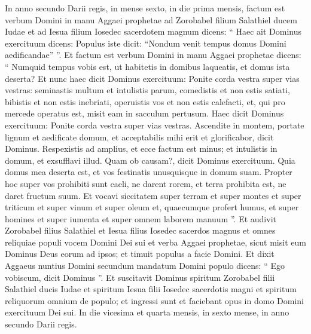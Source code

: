 \begin{biblechapter}
 \verse In anno secundo Darii regis, in mense sexto, in die prima mensis, factum est verbum Domini in manu Aggaei prophetae ad Zorobabel filium Salathiel ducem Iudae et ad Iesua filium Iosedec sacerdotem magnum dicens: 
\verse “ Haec ait Dominus exercituum dicens: Populus iste dicit: “Nondum venit tempus domus Domini aedificandae” ”. 
\verse Et factum est verbum Domini in manu Aggaei prophetae dicens: 
\verse “ Numquid tempus vobis est, ut habitetis in domibus laqueatis, et domus ista deserta? 
\verse Et nunc haec dicit Dominus exercituum: Ponite corda vestra super vias vestras: 
\verse seminastis multum et intulistis parum, comedistis et non estis satiati, bibistis et non estis inebriati, operuistis vos et non estis calefacti, et, qui pro mercede operatus est, misit eam in sacculum pertusum. 
\verse Haec dicit Dominus exercituum: Ponite corda vestra super vias vestras. 
\verse Ascendite in montem, portate lignum et aedificate domum, et acceptabilis mihi erit et glorificabor, dicit Dominus. 
 \verse Respexistis ad amplius, et ecce factum est minus; et intulistis in domum, et exsufflavi illud. Quam ob causam?, dicit Dominus exercituum. Quia domus mea deserta est, et vos festinatis unusquisque in domum suam. 
\verse Propter hoc super vos prohibiti sunt caeli, ne darent rorem, et terra prohibita est, ne daret fructum suum. 
\verse Et vocavi siccitatem super terram et super montes et super triticum et super vinum et super oleum et, quaecumque profert humus, et super homines et super iumenta et super omnem laborem manuum ”.
 \verse Et audivit Zorobabel filius Salathiel et Iesua filius Iosedec sacerdos magnus et omnes reliquiae populi vocem Domini Dei sui et verba Aggaei prophetae, sicut misit eum Dominus Deus eorum ad ipsos; et timuit populus a facie Domini.
 \verse Et dixit Aggaeus nuntius Domini secundum mandatum Domini populo dicens: “ Ego vobiscum, dicit Dominus ”. 
\verse Et suscitavit Dominus spiritum Zorobabel filii Salathiel ducis Iudae et spiritum Iesua filii Iosedec sacerdotis magni et spiritum reliquorum omnium de populo; et ingressi sunt et faciebant opus in domo Domini exercituum Dei sui. 
\verse In die vicesima et quarta mensis, in sexto mense, in anno secundo Darii regis.
 

\end{biblechapter}
